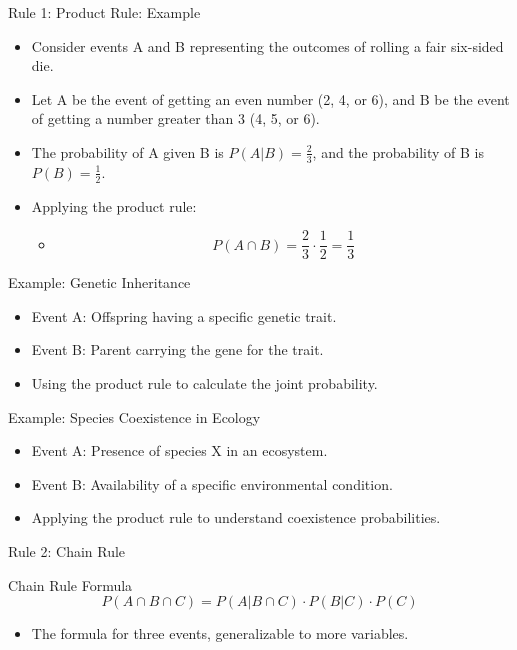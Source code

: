 \documentclass{beamer}
\begin{document}
\begin{frame}{Rule 1: Product Rule: Example}


  \begin{itemize}
      \item Consider events A and B representing the outcomes of rolling a fair six-sided die. 
      \item Let A be the event of getting an even number (2, 4, or 6), and B be the event of getting a number greater than 3 (4, 5, or 6). 
      \item The probability of A given B is \( P(A|B) = \frac{2}{3} \), and the probability of B is \( P(B) = \frac{1}{2} \).
      \item Applying the product rule:
      
        \begin{itemize}
			\item \[ P(A \cap B) = \frac{2}{3} \cdot \frac{1}{2} = \frac{1}{3} \]
		\end{itemize}
		
   \end{itemize}

\end{frame}


\begin{frame}{Example: Genetic Inheritance}
  \begin{itemize}
    \item Event A: Offspring having a specific genetic trait.
    \item Event B: Parent carrying the gene for the trait.
    \item Using the product rule to calculate the joint probability.
  \end{itemize}
\end{frame}

\begin{frame}{Example: Species Coexistence in Ecology}
  \begin{itemize}
    \item Event A: Presence of species X in an ecosystem.
    \item Event B: Availability of a specific environmental condition.
    \item Applying the product rule to understand coexistence probabilities.
  \end{itemize}
\end{frame}



\begin{frame}{Rule 2: Chain Rule}
  \begin{block}{Chain Rule Formula}
    \[
      P(A \cap B \cap C) = P(A|B \cap C) \cdot P(B|C) \cdot P(C)
    \]
  \end{block}

  \begin{itemize}
    \item The formula for three events, generalizable to more variables.
  \end{itemize}
\end{frame}
\end{document}
